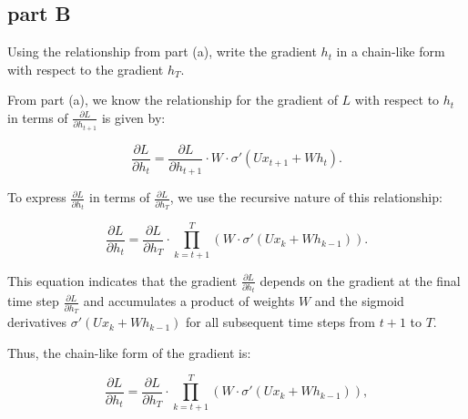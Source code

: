 \subsection{part B}
Using the relationship from part (a), write the gradient \( h_t \) in a chain-like form with respect to the gradient \( h_T \).

\begin{qsolve}
  \begin{qsolve}[]
    From part (a), we know the relationship for the gradient of \( L \) with respect to \( h_t \) in terms of \( \frac{\partial L}{\partial h_{t+1}} \) is given by:

    \[
    \frac{\partial L}{\partial h_t} = \frac{\partial L}{\partial h_{t+1}} \cdot W \cdot \sigma'(U x_{t+1} + W h_t).
    \]
    
    To express \( \frac{\partial L}{\partial h_t} \) in terms of \( \frac{\partial L}{\partial h_T} \), we use the recursive nature of this relationship:
    
    \[
    \frac{\partial L}{\partial h_t} = \frac{\partial L}{\partial h_T} \cdot \prod_{k=t+1}^T \left(W \cdot \sigma'(U x_k + W h_{k-1})\right).
    \]
    
    This equation indicates that the gradient \( \frac{\partial L}{\partial h_t} \) depends on the gradient at the final time step \( \frac{\partial L}{\partial h_T} \) and accumulates a product of weights \( W \) and the sigmoid derivatives \( \sigma'(U x_k + W h_{k-1}) \) for all subsequent time steps from \( t+1 \) to \( T \).
    
    Thus, the chain-like form of the gradient is:
    
    \[
    \frac{\partial L}{\partial h_t} = \frac{\partial L}{\partial h_T} \cdot \prod_{k=t+1}^T \left(W \cdot \sigma'(U x_k + W h_{k-1})\right),
    \]
  \end{qsolve}
\end{qsolve}
